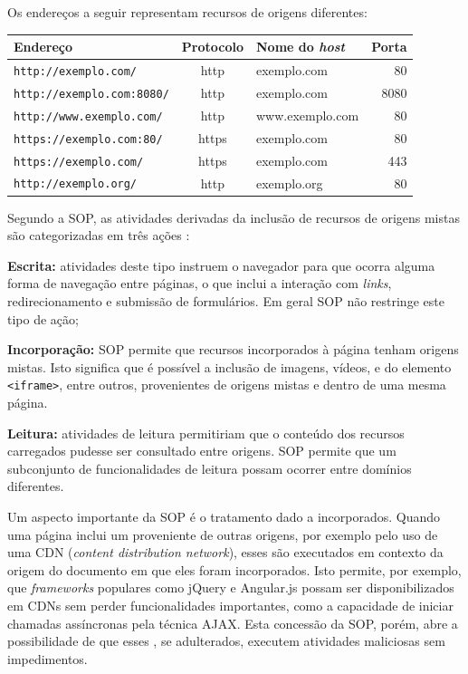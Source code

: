 Os endereços a seguir representam recursos de origens diferentes:

{\small
	\begin{tabular}{|l|c|l|r|}
		\hline 
		Endereço & Protocolo & Nome do \textit{host} & Porta \\ 
		\hline 
		\texttt{http://exemplo.com/} & http & exemplo.com & 80 \\ 
		\hline 
		\texttt{http://exemplo.com:8080/} & http & exemplo.com & 8080 \\ 
		\hline 
		\texttt{http://www.exemplo.com/} & http & www.exemplo.com & 80 \\ 
		\hline 
		\texttt{https://exemplo.com:80/} & https & exemplo.com & 80 \\ 
		\hline
		\texttt{https://exemplo.com/} & https & exemplo.com & 443 \\ 
		\hline
		\texttt{http://exemplo.org/} & http & exemplo.org & 80 \\ 
		\hline
	\end{tabular}
}

Segundo a SOP, as atividades derivadas da inclusão de recursos de origens mistas são categorizadas em três ações \cite{Ruderman2017}:

\begin{alineas}
	\item \textbf{Escrita:} atividades deste tipo instruem o navegador para que ocorra alguma forma de navegação entre páginas, o que inclui a interação com \textit{links}, redirecionamento e submissão de formulários. Em geral SOP não restringe este tipo de ação;
	\item \textbf{Incorporação:} SOP permite que recursos incorporados à página tenham origens mistas. Isto significa que é possível a inclusão de imagens, vídeos, {\scripts} e do elemento \texttt{<iframe>}, entre outros, provenientes de origens mistas e dentro de uma mesma página.
	\item \textbf{Leitura:} atividades de leitura permitiriam que o conteúdo dos recursos carregados pudesse ser consultado entre origens. SOP permite que um subconjunto de funcionalidades de leitura possam ocorrer entre domínios diferentes.
\end{alineas}

Um aspecto importante da SOP é o tratamento dado a {\scripts} incorporados. Quando uma página inclui um {\script} proveniente de outras origens, por exemplo pelo uso de uma CDN (\textit{content distribution network}), esses {\scripts} são executados em contexto da origem do documento em que eles foram incorporados. Isto permite, por exemplo, que \textit{frameworks} populares como jQuery e Angular.js possam ser disponibilizados em CDNs sem perder funcionalidades importantes, como a capacidade de iniciar chamadas assíncronas pela técnica AJAX. Esta concessão da SOP, porém, abre a possibilidade de que esses {\scripts}, se adulterados, executem atividades maliciosas sem impedimentos.

